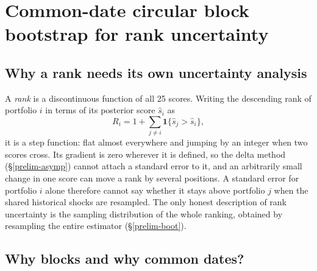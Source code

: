 \hypertarget{bootstrap}{}
\hypertarget{common-date-circular-block-bootstrap-for-rank-uncertainty}{%
\chapter{Common-date circular block bootstrap for rank
uncertainty}\label{common-date-circular-block-bootstrap-for-rank-uncertainty}}

\hypertarget{why-a-rank-needs-its-own-uncertainty-analysis}{%
\section{Why a rank needs its own uncertainty
analysis}\label{why-a-rank-needs-its-own-uncertainty-analysis}}

A \emph{rank} is a discontinuous function of all 25 scores. Writing the
descending rank of portfolio $i$ in terms of its posterior score $\hat s_i$
as
\begin{equation}\label{eq:ch9-rank}
R_i = 1 + \sum_{j\ne i}\mathbf{1}\{\hat s_j > \hat s_i\},
\end{equation}
it is a step function: flat almost everywhere and jumping by an integer when
two scores cross. Its gradient is zero wherever it is defined, so the delta
method (\S\ref{prelim-asymp}) cannot attach a standard error to it, and an
arbitrarily small change in one score can move a rank by several positions.
A standard error for portfolio $i$ alone therefore cannot say whether it
stays above portfolio $j$ when the shared historical shocks are resampled.
The only honest description of rank uncertainty is the sampling distribution
of the whole ranking, obtained by resampling the entire estimator
(\S\ref{prelim-boot}).

\hypertarget{why-blocks-and-why-common-dates}{%
\section{Why blocks and why common
dates?}\label{why-blocks-and-why-common-dates}}


